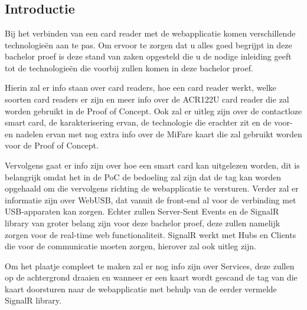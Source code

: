 \chapter{}%
\label{ch:stand-van-zaken}



\section{Introductie}
Bij het verbinden van een card reader met de webapplicatie komen verschillende technologieën aan te pas. Om ervoor te zorgen dat u alles goed begrijpt in deze bachelor proef is deze stand van zaken opgesteld die u de nodige inleiding geeft tot de technologieën die voorbij zullen komen in deze bachelor proef.  

Hierin zal er info staan over card readers, hoe een card reader werkt, welke soorten card readers er zijn en meer info over de ACR122U card reader die zal worden gebruikt in de Proof of Concept. Ook zal er uitleg zijn over de contactloze smart card, de karakterisering ervan, de technologie die erachter zit en de voor- en nadelen ervan met nog extra info over de MiFare kaart die zal gebruikt worden voor de Proof of Concept.  

Vervolgens gaat er info zijn over hoe een smart card kan uitgelezen worden, dit is belangrijk omdat het in de PoC de bedoeling zal zijn dat de tag kan worden opgehaald om die vervolgens richting de webapplicatie te versturen. Verder zal er informatie zijn over WebUSB, dat vanuit de front-end al voor de verbinding met USB-apparaten kan zorgen. Echter zullen Server-Sent Events en de SignalR library van groter belang zijn voor deze bachelor proef, deze zullen namelijk zorgen voor de real-time web functionaliteit. SignalR werkt met Hubs en Clients die voor de communicatie moeten zorgen, hierover zal ook uitleg zijn. 

Om het plaatje compleet te maken zal er nog info zijn over Services, deze zullen op de achtergrond draaien en wanneer er een kaart wordt gescand de tag van die kaart doorsturen naar de webapplicatie met behulp van de eerder vermelde SignalR library.


